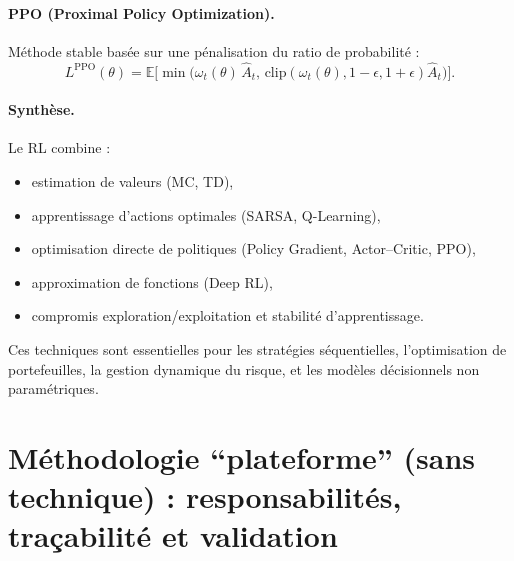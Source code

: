 \documentclass[11pt,a4paper]{article}
\newcommand{\1}{\mathbf{1}}
\begin{document}
\paragraph{PPO (Proximal Policy Optimization).}
Méthode stable basée sur une pénalisation du ratio de probabilité :
\[
L^{\mathrm{PPO}}(\theta)
=
\mathbb{E}\Big[
\min\big(
\omega_t(\theta)\,\hat A_t,\,
\mathrm{clip}(\omega_t(\theta),1-\epsilon,1+\epsilon)\hat A_t
\big)
\Big].
\]

\paragraph{Synthèse.}

Le RL combine :
\begin{itemize}
  \item estimation de valeurs (MC, TD),
  \item apprentissage d'actions optimales (SARSA, Q-Learning),
  \item optimisation directe de politiques (Policy Gradient, Actor--Critic, PPO),
  \item approximation de fonctions (Deep RL),
  \item compromis exploration/exploitation et stabilit\'e d'apprentissage.
\end{itemize}

Ces techniques sont essentielles pour les stratégies séquentielles,
l'optimisation de portefeuilles, la gestion dynamique du risque,
et les modèles décisionnels non paramétriques.

\section{M\'ethodologie ``plateforme'' (sans technique) : responsabilit\'es, tra\c{c}abilit\'e et validation}
\end{document}
